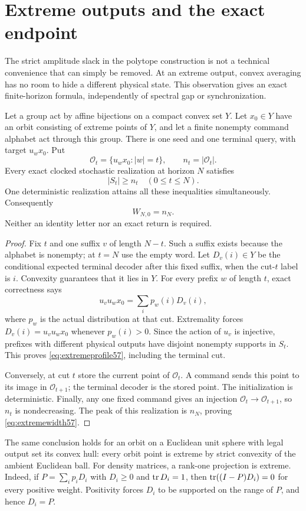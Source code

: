 \section{Extreme outputs and the exact endpoint}\label{sec:extreme57}
The strict amplitude slack in the polytope construction is not a technical
convenience that can simply be removed. At an extreme output, convex
averaging has no room to hide a different physical state. This observation
gives an exact finite-horizon formula, independently of spectral gap or
synchronization.

\begin{theorem}\label{thm:extreme57}
Let a group act by affine bijections on a compact convex set $Y$. Let
$x_0\in Y$ have an orbit consisting of extreme points of $Y$, and let a
finite nonempty command alphabet act through this group. There is one seed
and one terminal query, with target $u_w x_0$. Put
\[
 \mathcal O_t=\{u_wx_0:|w|=t\},\qquad n_t=|\mathcal O_t|.
\]
Every exact clocked stochastic realization at horizon $N$ satisfies
\begin{equation}\label{eq:extremeprofile57}
                         |S_t|\ge n_t\quad(0\le t\le N).
\end{equation}
One deterministic realization attains all these inequalities simultaneously.
Consequently
\begin{equation}\label{eq:extremewidth57}
                         W_{N,0}=n_N.
\end{equation}
Neither an identity letter nor an exact return is required.
\end{theorem}
\begin{proof}
Fix $t$ and one suffix $v$ of length $N-t$. Such a suffix exists because the
alphabet is nonempty; at $t=N$ use the empty word. Let $D_v(i)\in Y$ be the
conditional expected terminal decoder after this fixed suffix, when the
cut-$t$ label is $i$. Convexity guarantees that it lies in $Y$. For every
prefix $w$ of length $t$, exact correctness says
\[
             u_vu_wx_0=\sum_i p_w(i)D_v(i),
\]
where $p_w$ is the actual distribution at that cut. Extremality forces
$D_v(i)=u_vu_wx_0$ whenever $p_w(i)>0$. Since the action of $u_v$ is
injective, prefixes with different physical outputs have disjoint
nonempty supports in $S_t$. This proves \eqref{eq:extremeprofile57}, including
the terminal cut.

Conversely, at cut $t$ store the current point of $\mathcal O_t$. A command
sends this point to its image in $\mathcal O_{t+1}$; the terminal decoder is
the stored point. The initialization is deterministic. Finally, any one
fixed command gives an injection $\mathcal O_t\to\mathcal O_{t+1}$, so $n_t$
is nondecreasing. The peak of this realization is $n_N$, proving
\eqref{eq:extremewidth57}.
\end{proof}
The same conclusion holds for an orbit on a Euclidean unit sphere with
legal output set its convex hull: every orbit point is extreme by strict
convexity of the ambient Euclidean ball. For density matrices, a rank-one
projection is extreme. Indeed, if $P=\sum_i p_iD_i$ with $D_i\ge0$ and
$\operatorname{tr} D_i=1$, then $\operatorname{tr}((I-P)D_i)=0$ for every positive weight. Positivity
forces $D_i$ to be supported on the range of $P$, and hence $D_i=P$.

